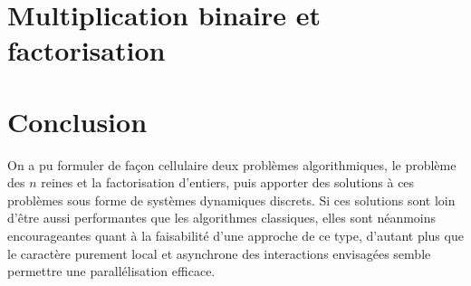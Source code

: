 \documentclass[11pt, openany, a4paper]{article}
\newcommand{\ANNOT}[1]{
  ~\linebreak
  \centerline{
    \large\fcolorbox{black}{bleuclair}{
      \begin{minipage}[h]{.8\linewidth}
      #1
      \end{minipage}
    }
  }
}
\begin{document}
\setcounter{section}{0}
\part*{Multiplication binaire et factorisation}
\label{part:facto}





\part*{Conclusion}

On a pu formuler de façon cellulaire deux problèmes algorithmiques, le problème des $n$ reines et la factorisation d'entiers, puis apporter des solutions à ces problèmes sous forme de systèmes dynamiques discrets. Si ces solutions sont loin d'être aussi performantes que les algorithmes classiques, elles sont néanmoins encourageantes quant à la faisabilité d'une approche de ce type, d'autant plus que le caractère purement local et asynchrone des interactions envisagées semble permettre une parallélisation efficace. 





\end{document}
